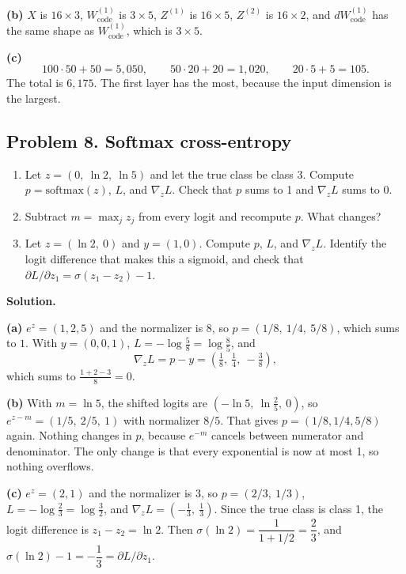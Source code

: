 \textbf{(b)} $X$ is $16\times 3$, $W^{(1)}_{\text{code}}$ is $3\times 5$, $Z^{(1)}$ is $16\times 5$, $Z^{(2)}$ is $16\times 2$, and $dW^{(1)}_{\text{code}}$ has the same shape as $W^{(1)}_{\text{code}}$, which is $3\times 5$.

\textbf{(c)}
\[
100\cdot 50 + 50 = 5{,}050,\qquad 50\cdot 20 + 20 = 1{,}020,\qquad 20\cdot 5 + 5 = 105.
\]
The total is $6{,}175$. The first layer has the most, because the input dimension is the largest.

\subsection*{Problem 8. Softmax cross-entropy}

\begin{enumerate}[label=(\alph*)]
\item Let $z = (0,\ \ln 2,\ \ln 5)$ and let the true class be class 3. Compute $p = \mathrm{softmax}(z)$, $L$, and $\nabla_z L$. Check that $p$ sums to 1 and $\nabla_z L$ sums to 0.
\item Subtract $m = \max_j z_j$ from every logit and recompute $p$. What changes?
\item Let $z = (\ln 2,\ 0)$ and $y = (1, 0)$. Compute $p$, $L$, and $\nabla_z L$. Identify the logit difference that makes this a sigmoid, and check that $\partial L/\partial z_1 = \sigma(z_1 - z_2) - 1$.
\end{enumerate}

\textbf{Solution.}

\textbf{(a)} $e^{z} = (1, 2, 5)$ and the normalizer is $8$, so $p = (1/8,\ 1/4,\ 5/8)$, which sums to $1$. With $y = (0,0,1)$, $L = -\log\tfrac58 = \log\tfrac85$, and
\[
\nabla_z L = p - y = \left(\tfrac18,\ \tfrac14,\ -\tfrac38\right),
\]
which sums to $\tfrac{1 + 2 - 3}{8} = 0$.

\textbf{(b)} With $m = \ln 5$, the shifted logits are $(-\ln 5,\ \ln\tfrac25,\ 0)$, so $e^{z - m} = (1/5,\ 2/5,\ 1)$ with normalizer $8/5$. That gives $p = (1/8, 1/4, 5/8)$ again. Nothing changes in $p$, because $e^{-m}$ cancels between numerator and denominator. The only change is that every exponential is now at most 1, so nothing overflows.

\textbf{(c)} $e^{z} = (2, 1)$ and the normalizer is $3$, so $p = (2/3,\ 1/3)$, $L = -\log\tfrac23 = \log\tfrac32$, and $\nabla_z L = (-\tfrac13,\ \tfrac13)$. Since the true class is class 1, the logit difference is $z_1 - z_2 = \ln 2$. Then $\sigma(\ln 2) = \dfrac{1}{1 + 1/2} = \dfrac23$, and $\sigma(\ln 2) - 1 = -\dfrac13 = \partial L/\partial z_1$.

